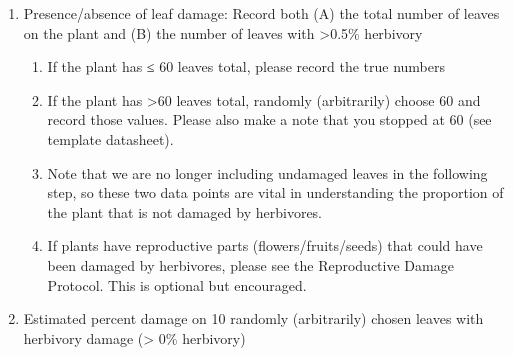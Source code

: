 \documentclass[
  letterpaper,
  DIV=11,
  numbers=noendperiod]{scrreprt}
\begin{document}
\begin{enumerate}
\def\labelenumi{\alph{enumi}.}
\item
  Presence/absence of leaf damage: Record both (A) the total number of
  leaves on the plant and (B) the number of leaves with
  \textgreater0.5\% herbivory

  \begin{enumerate}
  \def\labelenumii{\roman{enumii}.}
  \item
    If the plant has ≤ 60 leaves total, please record the true numbers
  \item
    If the plant has \textgreater60 leaves total, randomly (arbitrarily)
    choose 60 and record those values. Please also make a note that you
    stopped at 60 (see template datasheet).
  \item
    Note that we are no longer including undamaged leaves in the
    following step, so these two data points are vital in understanding
    the proportion of the plant that is not damaged by herbivores.
  \item
    If plants have reproductive parts (flowers/fruits/seeds) that could
    have been damaged by herbivores, please see the Reproductive Damage
    Protocol. This is optional but encouraged.
  \end{enumerate}
\item
  Estimated percent damage on 10 randomly (arbitrarily) chosen leaves
  with herbivory damage (\textgreater{} 0\% herbivory)


\end{enumerate}
\end{document}
